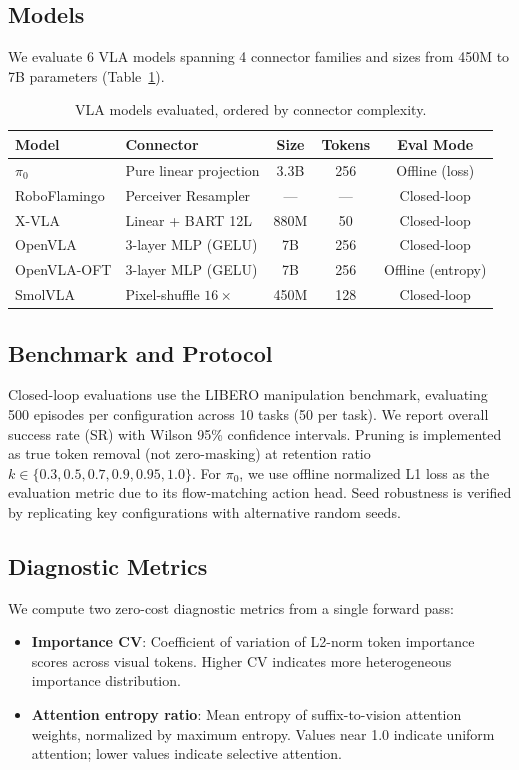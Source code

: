 \documentclass[letterpaper]{article}
\begin{document}
\subsection{Models}

We evaluate 6 VLA models spanning 4 connector families and sizes from 450M to 7B parameters (Table~\ref{tab:models}).

\begin{table}[h]
\centering
\caption{VLA models evaluated, ordered by connector complexity.}
\label{tab:models}
\small
\begin{tabular}{llccc}
\toprule
\textbf{Model} & \textbf{Connector} & \textbf{Size} & \textbf{Tokens} & \textbf{Eval Mode} \\
\midrule
$\pi_0$ & Pure linear projection & 3.3B & 256 & Offline (loss) \\
RoboFlamingo & Perceiver Resampler & --- & --- & Closed-loop \\
X-VLA & Linear + BART 12L & 880M & 50 & Closed-loop \\
OpenVLA & 3-layer MLP (GELU) & 7B & 256 & Closed-loop \\
OpenVLA-OFT & 3-layer MLP (GELU) & 7B & 256 & Offline (entropy) \\
SmolVLA & Pixel-shuffle $16\times$ & 450M & 128 & Closed-loop \\
\bottomrule
\end{tabular}
\end{table}

\subsection{Benchmark and Protocol}

Closed-loop evaluations use the LIBERO manipulation benchmark, evaluating 500 episodes per configuration across 10 tasks (50 per task). We report overall success rate (SR) with Wilson 95\% confidence intervals. Pruning is implemented as true token removal (not zero-masking) at retention ratio $k \in \{0.3, 0.5, 0.7, 0.9, 0.95, 1.0\}$. For $\pi_0$, we use offline normalized L1 loss as the evaluation metric due to its flow-matching action head. Seed robustness is verified by replicating key configurations with alternative random seeds.

\subsection{Diagnostic Metrics}

We compute two zero-cost diagnostic metrics from a single forward pass:
\begin{itemize}
    \item \textbf{Importance CV}: Coefficient of variation of L2-norm token importance scores across visual tokens. Higher CV indicates more heterogeneous importance distribution.
    \item \textbf{Attention entropy ratio}: Mean entropy of suffix-to-vision attention weights, normalized by maximum entropy. Values near 1.0 indicate uniform attention; lower values indicate selective attention.
\end{itemize}
\end{document}

